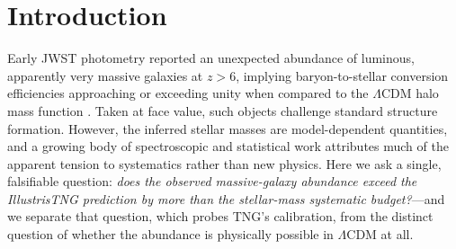 \documentclass[twocolumn]{aastex631}
\begin{document}
\begin{abstract}
masses were $\approx+0.70$~dex \emph{higher} than reported (opposite in sign, and $2.5\times$ larger
than any plausible downward budget). The larger apparent excess at $z\simeq7$--9 (Labb\'e et al.\
2023 candidates, $\approx13.6\times$, $1.13$~dex) requires $\approx0.72$~dex at the same slope ---
which \emph{exceeds} the committed $0.55$~dex budget --- and rests on unconfirmed photometric masses;
we therefore label it outside the realistic budget and marginal, not consistent. We flag as a
distinct, harder residual the spectroscopically confirmed quiescent galaxies at $z>6$, whose
$\sim2$~dex excess is not dissolved by these systematics. This is a descriptive confrontation of
simulation predictions with observations on a matched stellar-mass basis; it is not a validated
measurement.
\end{abstract}

\section{Introduction}
Early JWST photometry reported an unexpected abundance of luminous, apparently very massive galaxies at
$z>6$, implying baryon-to-stellar conversion efficiencies approaching or exceeding unity when compared to
the $\Lambda$CDM halo mass function \citep{labbe23}. Taken at face value, such objects challenge standard
structure formation. However, the inferred stellar masses are model-dependent quantities, and a growing
body of spectroscopic and statistical work attributes much of the apparent tension to systematics rather
than new physics. Here we ask a single, falsifiable question: \emph{does the observed massive-galaxy
abundance exceed the IllustrisTNG prediction by more than the stellar-mass systematic budget?}---and we
separate that question, which probes TNG's calibration, from the distinct question of whether the
abundance is physically possible in $\Lambda$CDM at all.
\end{document}
